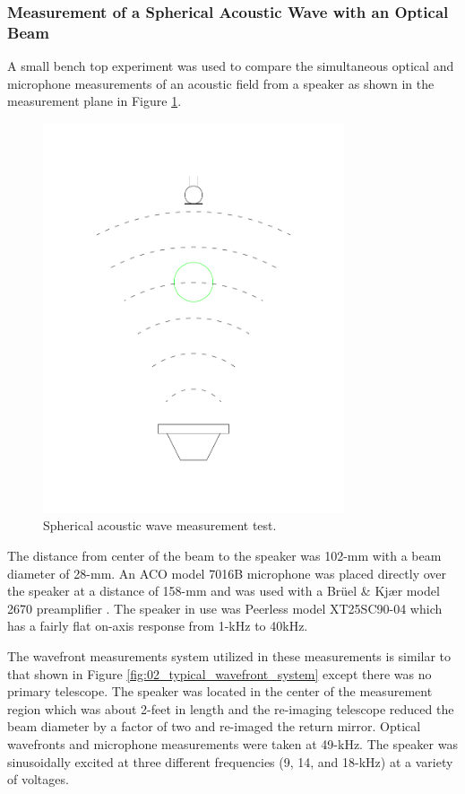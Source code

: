\subsubsection{Measurement of a Spherical Acoustic Wave with an Optical Beam}
A small bench top experiment was used to compare the simultaneous optical and microphone measurements of an acoustic field from a speaker as shown in the measurement plane in Figure \ref{fig:03_speaker_test}.
\begin{figure}
  \centering
  \includegraphics[width=3.5in,clip,trim=100 100 100 100]{../cad/speak_test.pdf}
  \caption{Spherical acoustic wave measurement test.}
  \label{fig:03_speaker_test}
\end{figure}
The distance from center of the beam to the speaker was 102-mm with a beam diameter of 28-mm.
An ACO model 7016B microphone \cite{ACO-Microphones} was placed directly over the speaker at a distance of 158-mm and was used with a Br\"uel \& Kj\ae r model 2670 preamplifier \cite{Bruel-Kjaer-2670}.
The speaker in use was Peerless model XT25SC90-04 \cite{Peerless-XT25SC90-04-1} which has a fairly flat on-axis response from 1-kHz to 40kHz.

The wavefront measurements system utilized in these measurements is similar to that shown in Figure \ref{fig:02_typical_wavefront_system} except there was no primary telescope.
The speaker was located in the center of the measurement region which was about 2-feet in length and the re-imaging telescope reduced the beam diameter by a factor of two and re-imaged the return mirror.
Optical wavefronts and microphone measurements were taken at 49-kHz.
The speaker was sinusoidally excited at three different frequencies (9, 14, and 18-kHz) at a variety of voltages.

